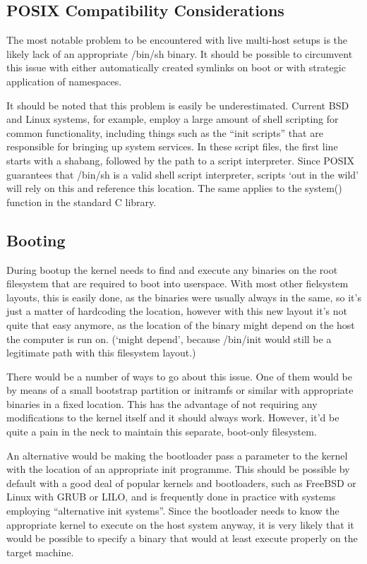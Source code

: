 \documentclass[a4paper,twoside,titlepage]{article}
\begin{document}
\subsection{POSIX Compatibility Considerations}
The most notable problem to be encountered with live multi-host setups is the
likely lack of an appropriate /bin/sh binary. It should be possible to
circumvent this issue with either automatically created symlinks on boot or
with strategic application of namespaces.

It should be noted that this problem is easily be underestimated. Current BSD
and Linux systems, for example, employ a large amount of shell scripting for
common functionality, including things such as the ``init scripts'' that are
responsible for bringing up system services. In these script files, the first
line starts with a shabang, followed by the path to a script interpreter. Since
POSIX guarantees that /bin/sh is a valid shell script interpreter, scripts `out
in the wild' will rely on this and reference this location. The same applies to
the system() function in the standard C library.

\subsection{Booting}
During bootup the kernel needs to find and execute any binaries on the root
filesystem that are required to boot into userspace. With most other fielsystem
layouts, this is easily done, as the binaries were usually always in the same,
so it's just a matter of hardcoding the location, however with this new layout
it's not quite that easy anymore, as the location of the binary might depend on
the host the computer is run on. (`might depend', because /bin/init would still
be a legitimate path with this filesystem layout.)

There would be a number of ways to go about this issue. One of them would be
by means of a small bootstrap partition or initramfs or similar with appropriate
binaries in a fixed location. This has the advantage of not requiring any
modifications to the kernel itself and it should always work. However, it'd be
quite a pain in the neck to maintain this separate, boot-only filesystem.

An alternative would be making the bootloader pass a parameter to the kernel
with the location of an appropriate init programme. This should be possible by
default with a good deal of popular kernels and bootloaders, such as FreeBSD or
Linux with GRUB or LILO, and is frequently done in practice with systems
employing ``alternative init systems''. Since the bootloader needs to know the
appropriate kernel to execute on the host system anyway, it is very likely that
it would be possible to specify a binary that would at least execute properly on
the target machine.
\end{document}

